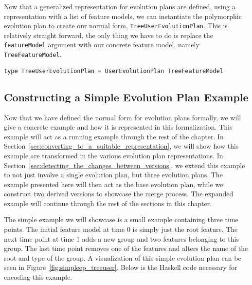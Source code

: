 \documentclass[a4paper,english]{ifimaster}
\begin{document}
Now that a generalized representation for evolution plans are defined, using a representation with a list of feature models, we can instantiate the polymorphic evolution plan to create our normal form, \texttt{TreeUserEvolutionPlan}. This is relatively straight forward, the only thing we have to do is replace the \texttt{featureModel} argument with our concrete feature model, namely \texttt{TreeFeatureModel}.

\begin{verbatim}
type TreeUserEvolutionPlan = UserEvolutionPlan TreeFeatureModel
\end{verbatim}

\subsection{Constructing a Simple Evolution Plan Example}%
\label{sub:constructing_a_simple_evolution_plan_example}

Now that we have defined the normal form for evolution plans formally, we will give a concrete example and how it is represented in this formalization. This example will act as a running example through the rest of the chapter. In Section~\vref{sec:converting_to_a_suitable_representation}, we will show how this example are transformed in the various evolution plan representations. In Section~\vref{sec:detecting_the_changes_between_versions}, we extend this example to not just involve a single evolution plan, but three evolution plans. The example presented here will then act as the base evolution plan, while we construct two derived versions to showcase the merge process. The expanded example will continue through the rest of the sections in this chapter.

The simple example we will showcase is a small example containing three time points. The initial feature model at time 0 is simply just the root feature. The next time point at time 1 adds a new group and two features belonging to this group. The last time point removes one of the features and alters the name of the root and type of the group. A visualization of this simple evolution plan can be seen in Figure~\vref{fig:simpleep_treeuser}. Below is the Haskell code necessary for encoding this example.
\end{document}
